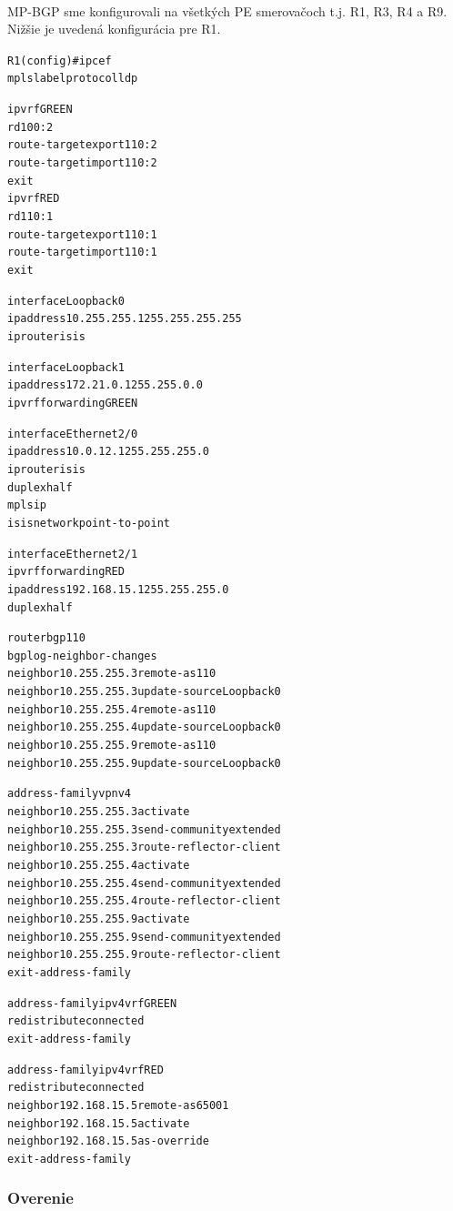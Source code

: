 \documentclass[12pt,twoside,a4paper]{report}
\begin{document}
\paragraph{}
MP-BGP sme konfigurovali na všetkých PE smerovačoch t.j. R1, R3, R4 a R9. Nižšie je uvedená konfigurácia pre R1.

\noindent
{\selectfont
\begin{small}
\begin{alltt}
R1(config)#ip cef
mpls label protocol ldp

ip vrf GREEN
 rd 100:2 
 route-target export 110:2
 route-target import 110:2
 exit
ip vrf RED
 rd 110:1
 route-target export 110:1
 route-target import 110:1
 exit

interface Loopback0
 ip address 10.255.255.1 255.255.255.255
 ip router isis

interface Loopback1
 ip address 172.21.0.1 255.255.0.0
 ip vrf forwarding GREEN

interface Ethernet2/0
 ip address 10.0.12.1 255.255.255.0
 ip router isis 
 duplex half
 mpls ip
 isis network point-to-point 

interface Ethernet2/1
 ip vrf forwarding RED
 ip address 192.168.15.1 255.255.255.0
 duplex half

router bgp 110
 bgp log-neighbor-changes
 neighbor 10.255.255.3 remote-as 110
 neighbor 10.255.255.3 update-source Loopback0
 neighbor 10.255.255.4 remote-as 110
 neighbor 10.255.255.4 update-source Loopback0
 neighbor 10.255.255.9 remote-as 110
 neighbor 10.255.255.9 update-source Loopback0

 address-family vpnv4
  neighbor 10.255.255.3 activate
  neighbor 10.255.255.3 send-community extended
  neighbor 10.255.255.3 route-reflector-client
  neighbor 10.255.255.4 activate
  neighbor 10.255.255.4 send-community extended
  neighbor 10.255.255.4 route-reflector-client
  neighbor 10.255.255.9 activate
  neighbor 10.255.255.9 send-community extended
  neighbor 10.255.255.9 route-reflector-client
 exit-address-family
 
 address-family ipv4 vrf GREEN
  redistribute connected
 exit-address-family
 
 address-family ipv4 vrf RED
  redistribute connected
  neighbor 192.168.15.5 remote-as 65001
  neighbor 192.168.15.5 activate
  neighbor 192.168.15.5 as-override
 exit-address-family
\end{alltt}
\end{small}
}


\subsubsection{Overenie}
\end{document}
